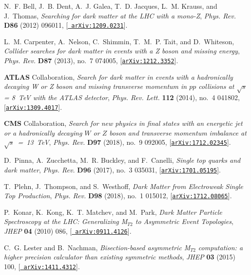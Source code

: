 \documentclass[a4paper, 11pt,notoc]{article}
\begin{document}
\begin{thebibliography}{100}
N.~F. Bell, J.~B. Dent, A.~J. Galea, T.~D. Jacques, L.~M. Krauss, and J.~Thomas, 
{\it Searching for dark matter at the {LHC} with a mono-{Z}},  {\em Phys. Rev.}
  {\bf D86} (2012) 096011, [\href{http://arxiv.org/abs/1209.0231}{{\tt
  arXiv:1209.0231}}].
  
L.~M. Carpenter, A.~Nelson, C.~Shimmin, T.~M.~P. Tait, and D.~Whiteson, {\it
  {Collider searches for dark matter in events with a Z boson and missing
  energy}},  {\em Phys. Rev.} {\bf D87} (2013), no.~7 074005,
  [\href{http://arxiv.org/abs/1212.3352}{{\tt arXiv:1212.3352}}].

{\bf ATLAS} Collaboration, {\it {Search for dark matter in
  events with a hadronically decaying W or Z boson and missing transverse
  momentum in $pp$ collisions at $\sqrt{s}$ = 8~TeV with the ATLAS detector}},
  {\em Phys. Rev. Lett.} {\bf 112} (2014), no.~4 041802,
  [\href{http://arxiv.org/abs/1309.4017}{{\tt arXiv:1309.4017}}].

{\bf CMS} Collaboration, {\it {Search for new physics in
  final states with an energetic jet or a hadronically decaying $W$ or $Z$
  boson and transverse momentum imbalance at $\sqrt{s}$~=~13~TeV}},  {\em Phys. Rev.} {\bf D97} (2018), no.~9 092005,
  [\href{http://arxiv.org/abs/1712.02345}{{\tt arXiv:1712.02345}}].

D.~Pinna, A.~Zucchetta, M.~R. Buckley, and F.~Canelli, {\it {Single top quarks
  and dark matter}},  {\em Phys. Rev.} {\bf D96} (2017), no.~3 035031,
  [\href{http://arxiv.org/abs/1701.05195}{{\tt arXiv:1701.05195}}].

T.~Plehn, J.~Thompson, and S.~Westhoff, {\it {Dark Matter from Electroweak
  Single Top Production}},  {\em Phys. Rev.} {\bf D98} (2018), no.~1 015012,
  [\href{http://arxiv.org/abs/1712.08065}{{\tt arXiv:1712.08065}}].

P.~Konar, K.~Kong, K.~T. Matchev, and M.~Park, {\it {Dark Matter Particle
  Spectroscopy at the LHC: Generalizing M$_{T2}$ to Asymmetric Event Topologies}},
   {\em JHEP} {\bf 04} (2010) 086, [\href{http://arxiv.org/abs/0911.4126}{{\tt
  arXiv:0911.4126}}].

C.~G. Lester and B.~Nachman, {\it {Bisection-based asymmetric M$_{T2}$
  computation: a higher precision calculator than existing symmetric methods}},
   {\em JHEP} {\bf 03} (2015) 100, [\href{http://arxiv.org/abs/1411.4312}{{\tt
  arXiv:1411.4312}}].


\end{thebibliography}
\end{document}
